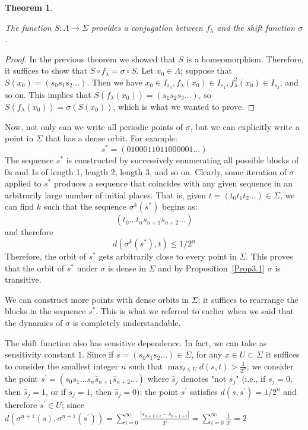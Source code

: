 \documentclass[12pt,a4paper]{report}
\newtheorem{teorema}{Theorem}[section]
\theoremstyle{definition}
\begin{document}
\begin{teorema}\label{Te3.3.3}

The function \(S:\Lambda\rightarrow\Sigma\) provides a conjugation between \(f_{\lambda}\) and the shift function \(\sigma\).

\end{teorema}


\begin{proof}

In the previous theorem we showed that \(S\) is a homeomorphism. Therefore, it suffices to show that \(S\circ f_{\lambda}=\sigma\circ S\). Let \(x_{0}\in\Lambda\); suppose that \(S(x_{0})=(s_{0}s_{1}s_{2}...)\). Then we have \(x_{0}\in I_{s_{0}}, f_{\lambda}(x_{0})\in I_{s_{1}}, f_{\lambda}^{2}(x_{0})\in I_{s_{2}}\), and so on. This implies that \(S(f_{\lambda}(x_{0}))=(s_{1}s_{2}s_{3}...)\), so \(S(f_{\lambda}(x_{0}))=\sigma(S(x_{0}))\), which is what we wanted to prove.

\end{proof}

Now, not only can we write all periodic points of \(\sigma\), but we can explicitly write a point in \(\Sigma\) that has a dense orbit. For example:
\[
s^{*}=(0100011011000001...)
\]
%
The sequence \(s^{*}\) is constructed by successively enumerating all possible blocks of 0s and 1s of length 1, length 2, length 3, and so on. Clearly, some iteration of \(\sigma\) applied to \(s^{*}\) produces a sequence that coincides with any given sequence in an arbitrarily large number of initial places. That is, given \(t=(t_{0}t_{1}t_{2}...)\in\Sigma\), we can find \(k\) such that the sequence \(\sigma^{k}(s^{*})\) begins as:
\[
(t_{0}...t_{n}s_{n+1}s_{n+2}...)
\]
%
and therefore
\[
d(\sigma^{k}(s^{*}),t)\le1/2^{n}
\]
%
Therefore, the orbit of \(s^{*}\) gets arbitrarily close to every point in \(\Sigma\). This proves that the orbit of \(s^{*}\) under \(\sigma\) is dense in \(\Sigma\) and by Proposition~\ref{Prop3.1} \(\sigma\) is transitive.
 
We can construct more points with dense orbits in \(\Sigma\); it suffices to rearrange the blocks in the sequence \(s^{*}\). This is what we referred to earlier when we said that the dynamics of \(\sigma\) is completely understandable.

The shift function also has sensitive dependence. In fact, we can take as sensitivity constant $1$. Since if \(s=(s_{0}s_{1}s_{2}...)\in\Sigma\), for any $x \in U \subset \Sigma$ it suffices to consider the smallest integer $n$ such that $\max_{t \in U} d(s,t) > \frac{1}{2^n}$; we consider the point $s^{\prime} =(s_{0}s_{1}...s_{n}\hat{s}_{n+1}\hat{s}_{n+2}...)$ where
\(\hat{s}_{j}\) denotes "not \(s_{j}\)" (i.e., if \(s_{j}=0\), then \(\hat{s}_{j}=1\), or if \(s_{j}=1\), then \(\hat{s}_{j}=0\)); the point \(s^{\prime}\) satisfies 
\(d(s,s^{\prime})=1/2^{n}\) and therefore $s^{\prime} \in U$; since \(d(\sigma^{n+1}(s),\sigma^{n+1}(s^{\prime}))=  \sum_{i=0}^{\infty}\frac{|s_{n+1+i}-\hat{s}_{n+1+i}|}{2^i} = \sum_{i=0}^{\infty}\frac{1}{2^i} = 2\)
\end{document}
